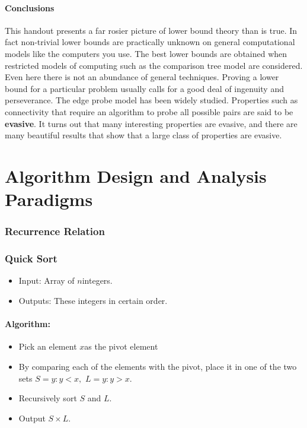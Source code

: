 \documentclass[en,hazy,blue,screen,14pt]{elegantnote}
\begin{document}
\subsection{Conclusions }

This handout presents a far rosier picture of lower bound theory than
is true. In fact non-trivial lower bounds are practically unknown
on general computational models like the computers you use. The best
lower bounds are obtained when restricted models of computing such
as the comparison tree model are considered. Even here there is not
an abundance of general techniques. Proving a lower bound for a particular
problem usually calls for a good deal of ingenuity and perseverance.
The edge probe model has been widely studied. Properties such as connectivity
that require an algorithm to probe all possible pairs are said to
be \textbf{evasive}. It turns out that many interesting properties
are evasive, and there are many beautiful results that show that a
large class of properties are evasive. 

\part{Algorithm Design and Analysis Paradigms}

\section{Recurrence Relation}

\section{Quick Sort}
\begin{itemize}
\item Input: Array of $n$integers.
\item Outputs: These integers in certain order.
\end{itemize}

\subsection{Algorithm:}
\begin{itemize}
\item Pick an element $x$as the pivot element
\item By comparing each of the elements with the pivot, place it in one
of the two sets $S={y:y<x},$ $L={y:y>x}$.
\item Recursively sort $S$ and $L$.
\item Output $S\times L$.
\end{itemize}
\end{document}
